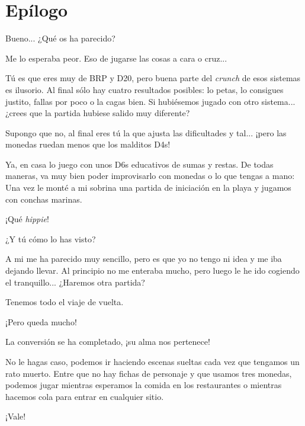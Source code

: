\documentclass[10pt, a5paper, twocolumn]{article}
\newenvironment{dialogue}
    {\begin{description}[leftmargin=!,align=right,labelwidth=0.cm]}
    {\end{description}}
\newcommand\A{\item[\raisebox{-0.25em}{\scalebox{0.75}{\bctetraedre}}]}
\newcommand\B{\item[\raisebox{-0.25em}{\scalebox{0.75}{\bccube}}]}
\newcommand\E{\item[\raisebox{-0.25em}{\scalebox{0.75}{\bcicosaedre}}]}
\begin{document}
    \section*{Epílogo} %

    \begin{dialogue}
        \E Bueno... ¿Qué os ha parecido?
        \B Me lo esperaba peor. Eso de jugarse las cosas a cara o cruz...
        \E Tú es que eres muy de BRP y D20, pero buena parte del \emph{crunch} de esos sistemas es ilusorio. Al final sólo hay cuatro resultados posibles: lo petas, lo consigues justito, fallas por poco o la cagas bien. Si hubiésemos jugado con otro sistema... ¿crees que la partida hubiese salido muy diferente?
        \B Supongo que no, al final eres tú la que ajusta las dificultades y tal... ¡pero las monedas ruedan menos que los malditos D4s!
        \E Ya, en casa lo juego con unos D6s educativos de sumas y restas. De todas maneras, va muy bien poder improvisarlo con monedas o lo que tengas a mano: Una vez le monté a mi sobrina una partida de iniciación en la playa y jugamos con conchas marinas.
        \B ¡Qué \emph{hippie}!
        \E ¿Y tú cómo lo has visto?
        \A A mi me ha parecido muy sencillo, pero es que yo no tengo ni idea y me iba dejando llevar. Al principio no me enteraba mucho, pero luego le he ido cogiendo el tranquillo...  ¿Haremos otra partida?
        \E Tenemos todo el viaje de vuelta.
        \A ¡Pero queda mucho!
        \B La conversión se ha completado, ¡su alma nos pertenece!
        \E No le hagas caso, podemos ir haciendo escenas sueltas cada vez que tengamos un rato muerto. Entre que no hay fichas de personaje y que usamos tres monedas, podemos jugar mientras esperamos la comida en los restaurantes o mientras hacemos cola para entrar en cualquier sitio.
        \A ¡Vale!
    \end{dialogue}
\end{document}
